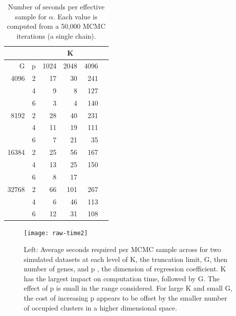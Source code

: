 \begin{table}[ht]
\caption{Number of seconds per effective sample for $\alpha$. Each value is computed from a 50,000 MCMC iterations (a single chain).}
\label{tab:neff-alpha}
\centering
\begin{tabular}{rrrrrr}

  &   & \multicolumn{3}{c}{K}\\
  \hline
G & p & 1024 & 2048 & 4096 \\ 
  \hline
4096  & 2 & 17 & 30 & 241 \\ 
      & 4 & 9 & 8 & 127 \\ 
      & 6 & 3 & 4 & 140 \\ 
8192  & 2 & 28 & 40 & 231 \\ 
      & 4 & 11 & 19 & 111 \\ 
      & 6 & 7 & 21 & 35 \\ 
16384 & 2 & 25 & 56 & 167 \\ 
      & 4 & 13 & 25 & 150 \\ 
      & 6 & 8 & 17 &  \\ 
32768 & 2 & 66 & 101 & 267 \\ 
      & 4 & 6 & 46 & 113 \\ 
      & 6 & 12 & 31 & 108 \\ 
   \hline
\end{tabular}

\end{table}


\begin{figure}[ht]
\centering
\texttt{[image: raw-time2]}
\caption[Average number of seconds per MCMC sample]{Left: Average seconds required per MCMC sample across for two simulated datasets at each level of K, the truncation limit, G, then number of genes, and p , the dimension of regression coefficient. K has the largest impact on computation time, followed by G. The effect of p is small in the range considered. For large K and small G, the cost of increasing p appears to be offset by the smaller number of occupied clusters in a higher dimensional space.}%
\label{raw-time}
\end{figure}

